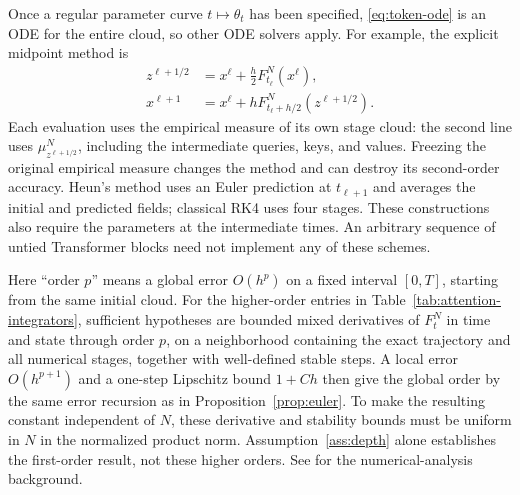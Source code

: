 \documentclass[11pt]{amsart}
\numberwithin{equation}{section}
\theoremstyle{plain}
\begin{document}
Once a regular parameter curve $t\mapsto\theta_t$ has been specified,
\eqref{eq:token-ode} is an ODE for the entire cloud, so other ODE solvers
apply.  For example, the explicit midpoint method is
\begin{equation}\label{eq:attention-explicit-midpoint}
 \begin{split}
  z^{\ell+1/2}&=x^\ell+\frac h2F_{t_\ell}^N(x^\ell),\\
  x^{\ell+1}&=x^\ell+hF_{t_\ell+h/2}^N(z^{\ell+1/2}).
 \end{split}
\end{equation}
Each evaluation uses the empirical measure of its own stage cloud:
the second line uses $\mu_{z^{\ell+1/2}}^N$, including the intermediate
queries, keys, and values.  Freezing the original empirical measure changes
the method and can destroy its second-order accuracy.  Heun's method uses
an Euler prediction at $t_{\ell+1}$ and averages the initial and predicted
fields; classical RK4 uses four stages.  These constructions also require
the parameters at the intermediate times.  An arbitrary sequence of untied
Transformer blocks need not implement any of these schemes.

Here ``order $p$'' means a global error $O(h^p)$ on a fixed interval
$[0,T]$, starting from the same initial cloud.  For the higher-order entries
in Table~\ref{tab:attention-integrators}, sufficient hypotheses are bounded
mixed derivatives of $F_t^N$ in time and state through order $p$, on a
neighborhood containing the exact trajectory and all numerical stages,
together with well-defined stable steps.  A local error $O(h^{p+1})$ and a
one-step Lipschitz bound $1+Ch$ then give the global order by the same
error recursion as in Proposition~\ref{prop:euler}.  To make the resulting
constant independent of $N$, these derivative and stability bounds must be
uniform in $N$ in the normalized product norm.  Assumption~\ref{ass:depth}
alone establishes the first-order result, not these higher orders.  See
\cite{HairerLubichNumericalODE} for the numerical-analysis background.
\end{document}
